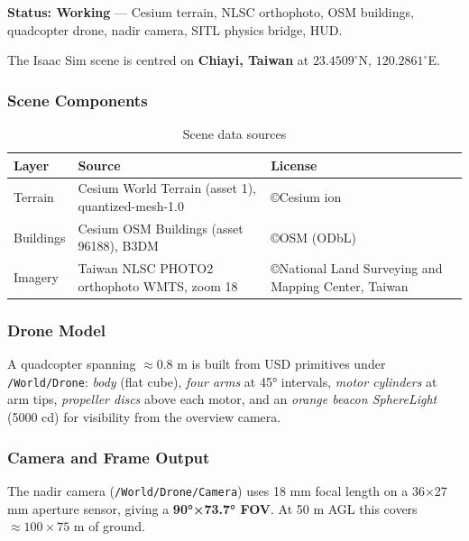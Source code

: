 \documentclass[11pt,a4paper]{article}
\begin{document}
\begin{donebox}
\textbf{Status: Working} --- Cesium terrain, NLSC orthophoto, OSM buildings, quadcopter drone, nadir camera, SITL physics bridge, HUD.
\end{donebox}

\vspace{6pt}
The Isaac Sim scene is centred on \textbf{Chiayi, Taiwan} at $23.4509^\circ$N, $120.2861^\circ$E.

\subsubsection*{Scene Components}

\begin{table}[h]
\centering
\caption{Scene data sources}
\begin{tabular}{@{}lll@{}}
\toprule
\textbf{Layer} & \textbf{Source} & \textbf{License}\\
\midrule
Terrain & Cesium World Terrain (asset 1), quantized-mesh-1.0 & \copyright Cesium ion\\
Buildings & Cesium OSM Buildings (asset 96188), B3DM & \copyright OSM (ODbL)\\
Imagery & Taiwan NLSC PHOTO2 orthophoto WMTS, zoom 18 & \copyright National Land Surveying and Mapping Center, Taiwan\\
\bottomrule
\end{tabular}
\end{table}

\subsubsection*{Drone Model}

A quadcopter spanning $\approx 0.8$ m is built from USD primitives under \texttt{/World/Drone}:
\textit{body} (flat cube), \textit{four arms} at 45° intervals, \textit{motor cylinders} at arm tips,
\textit{propeller discs} above each motor, and an \textit{orange beacon SphereLight} (5000 cd)
for visibility from the overview camera.

\subsubsection*{Camera and Frame Output}

The nadir camera (\texttt{/World/Drone/Camera}) uses 18 mm focal length on a 36×27 mm aperture
sensor, giving a \textbf{90°×73.7° FOV}.  At 50 m AGL this covers $\approx 100\times75$ m of
ground.
\end{document}
